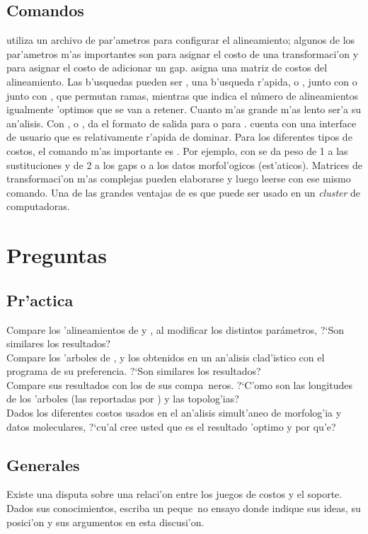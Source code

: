 \subsection{Comandos}
 utiliza un archivo de par'ametros para configurar el alineamiento; algunos de los par'ametros m'as 
importantes son  para asignar el costo de una transformaci'on y  para asignar el costo de 
adicionar un gap.  asigna una matriz de costos del alineamiento. Las b'usquedas pueden ser , 
una b'usqueda r'apida, o , junto con  o junto con , que permutan ramas, 
mientras que  indica el n\'umero de alineamientos igualmente 'optimos que se van a retener. Cuanto m'as grande m'as lento ser'a su an'alisis. Con , o , da el formato de salida para  o 
para .  cuenta con una interface de usuario que es relativamente r'apida de dominar. Para los diferentes tipos de costos, el comando m'as importante es . Por ejemplo, con  se da peso de 1 a las sustituciones y de 2 a los gaps o a los datos morfol'ogicos (est'aticos). Matrices de transformaci'on m'as complejas pueden elaborarse y luego leerse con ese mismo comando. Una de las grandes ventajas de  es que puede ser usado en un \textit{cluster} de computadoras.\\
\section{Preguntas}
\subsection{Pr'actica}
\noindent
Compare los 'alineamientos de  y , al modificar los distintos par\'ametros, ?`Son similares los resultados?\\
Compare los 'arboles de ,  y los obtenidos en un an'alisis clad'istico con el programa de su  preferencia. ?`Son similares los resultados?\\
Compare sus resultados con los de sus compa~neros. ?`C'omo son las longitudes de los 'arboles (las reportadas por ) y las topolog'ias?\\
Dados los diferentes costos usados en el an'alisis simult'aneo de morfolog'ia y datos moleculares, 
 ?`cu'al cree usted que es el resultado 'optimo y por qu'e?
\subsection{Generales}
\noindent
Existe una disputa sobre una relaci'on entre los juegos de costos y el soporte. Dados sus conocimientos, escriba un 
peque~no ensayo donde indique sus ideas, su posici'on y sus argumentos en esta discusi'on.
